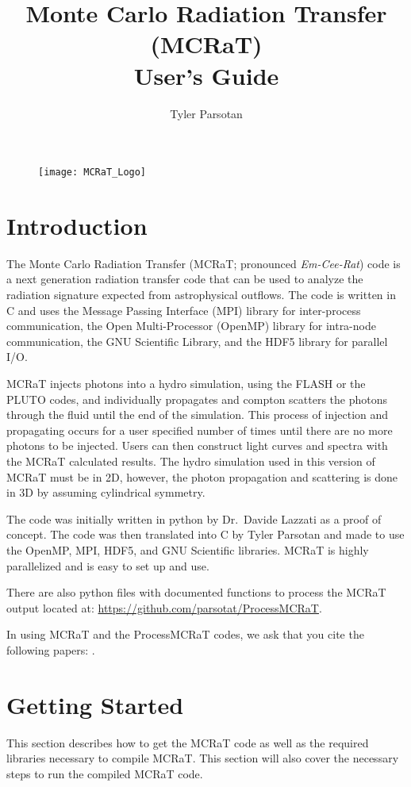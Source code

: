 \documentclass[12pt,a4paper]{article}
\title{Monte Carlo Radiation Transfer (MCRaT)\\User's Guide}
\author{Tyler Parsotan}
\date{}
\begin{document}
\begin{figure}
\centering
\texttt{[image: MCRaT\_Logo]}
\end{figure}
\maketitle

\tableofcontents
\newpage

\section{Introduction}
The Monte Carlo Radiation Transfer (MCRaT; pronounced \textit{Em-Cee-Rat}) code is a next generation radiation transfer code that can be used to analyze the radiation signature expected from astrophysical outflows. The code is written in C and uses the Message Passing Interface (MPI) library for inter-process communication, the Open Multi-Processor (OpenMP) library for intra-node communication, the GNU Scientific Library, and the HDF5 library for parallel I/O.

MCRaT injects photons into a hydro simulation, using the FLASH or the PLUTO codes, and individually propagates and compton scatters the photons through the fluid until the end of the simulation. This process of injection and propagating occurs for a user specified number of times until there are no more photons to be injected. Users can then construct light curves and spectra with the MCRaT calculated results. The hydro simulation used in this version of MCRaT must be in 2D, however, the photon propagation and scattering is done in 3D by assuming cylindrical symmetry.

The code was initially written in python by Dr.\ Davide Lazzati as a proof of concept. The code was then translated into C by Tyler Parsotan and made to use the OpenMP, MPI, HDF5, and GNU Scientific libraries. MCRaT is highly parallelized and is easy to set up and use.

There are also python files with documented functions to process the MCRaT output located at: \url{https://github.com/parsotat/ProcessMCRaT}.

In using MCRaT and the ProcessMCRaT codes, we ask that you cite the following papers: \cite{MCRaT, parsotan_mcrat, parsotan_var, parsotan_polarization}.

\section{Getting Started}
This section describes how to get the MCRaT code as well as the required libraries necessary to compile MCRaT. This section will also cover the necessary steps to run the compiled MCRaT code. 
\end{document}
